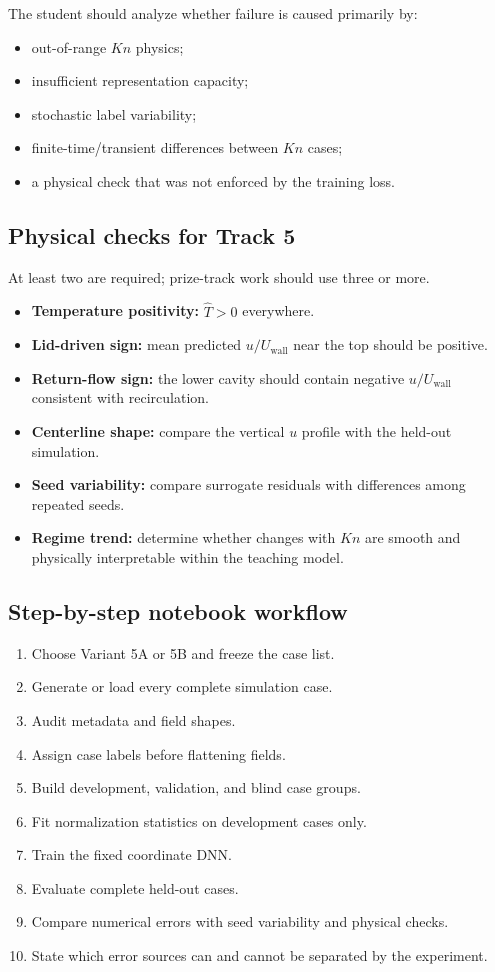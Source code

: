 \documentclass[11pt]{article}
\begin{document}
The student should analyze whether failure is caused primarily by:
\begin{itemize}
\item out-of-range $Kn$ physics;
\item insufficient representation capacity;
\item stochastic label variability;
\item finite-time/transient differences between $Kn$ cases;
\item a physical check that was not enforced by the training loss.
\end{itemize}

\subsection{Physical checks for Track 5}
At least two are required; prize-track work should use three or more.
\begin{itemize}
\item \textbf{Temperature positivity:} $\hat T>0$ everywhere.
\item \textbf{Lid-driven sign:} mean predicted $u/U_{\mathrm{wall}}$ near the top should be positive.
\item \textbf{Return-flow sign:} the lower cavity should contain negative $u/U_{\mathrm{wall}}$ consistent with recirculation.
\item \textbf{Centerline shape:} compare the vertical $u$ profile with the held-out simulation.
\item \textbf{Seed variability:} compare surrogate residuals with differences among repeated seeds.
\item \textbf{Regime trend:} determine whether changes with $Kn$ are smooth and physically interpretable within the teaching model.
\end{itemize}

\subsection{Step-by-step notebook workflow}
\begin{enumerate}
\item Choose Variant 5A or 5B and freeze the case list.
\item Generate or load every complete simulation case.
\item Audit metadata and field shapes.
\item Assign case labels before flattening fields.
\item Build development, validation, and blind case groups.
\item Fit normalization statistics on development cases only.
\item Train the fixed coordinate DNN.
\item Evaluate complete held-out cases.
\item Compare numerical errors with seed variability and physical checks.
\item State which error sources can and cannot be separated by the experiment.
\end{enumerate}
\end{document}
